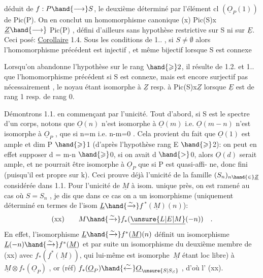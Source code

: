 
déduit de $f:P\hand{\longrightarrow} S$, le deuxième  déterminé par l'élément  cl $(\underline{O}_P(1))$ de
Pic(P). On en conclut un homomorphisme canonique
(x) \qquad Pic(S)x $\underline{Z} \hand{\longrightarrow}$ Pic(P)  ,
défini d'ailleurs sans hypothèse restrictive sur S ni sur $\underline{E}$.  Ceci posé:
\uline{Corollaire} 1.4.\placedmargin{\ensuremath{\swarrow}}   Sous les conditions de 1.. , si $S\neq\emptyset$ 
 alors l'homomorphisme précédent est  injectif , et même
bijectif lorsque S est connexe

\placedmargin{[} Lorsqu'on  abandonne l'hypothèse
sur le rang $\hand{\geqslant} 2$,  il résulte de 1.2. et 1.. que l'homomorphisme précédent
si S est connexe, mais
est encore surjectif  pas nécessairement , le noyau étant
isomorphe 
à $\underline{Z}$  resp. à  Pic(S)x$\underline{Z}$  lorsque  $\underline{E}$  est de rang 1\hand{,} resp. de rang 0.

Démontrons  1.1.  en commençant par l'unicité.  Tout d'abord, si S est
le spectre d'un corps, notons que  $\underline{O}(n)$ n'est isomorphe à $\underline{O}(m)$ i.e.
$\underline{O}(m-n)$  n'est  isomorphe à $\underline{O}_P$ , que si  n=m i.e.  n-m=0 .  Cela provient
du fait que $\underline{O}(1)$ est ample et  dim P $\hand{\geqslant}$1 (d'après l'hypothèse rang E $\hand{\geqslant}$2):
on peut en effet supposer  d = m-n $\hand{\geqslant}$0, si on avait d $\hand{>}$0, alors $\underline{O}(d)$
serait ample, et ne pourrait être isomorphe à  $\underline{O}_P$ que si P est quasi-affi-%
ne, donc fini (puisqu'il est propre sur k).  Ceci prouve déjà  l'unicité
de la famille $(S_n)_{n\hand{\in}\underline{Z}}$  considérée dans 1.1.  Pour l'unicité de $\underline{M}$ à isom.
unique près, on est ramené au cas où  $S=S_n$ , je dis que dans ce cas on a
un isomorphisme  (uniquement déterminé en termes de l'isom  $\underline{L} \hand{\xrightarrow{\sim}} f$$^*$$(\underline{M})(n)$):
\[ \text{(xx)} \qquad M \hand{\xrightarrow{\sim}} f_*(\underline{\unsure{L|E|M}}(-n)) \quad . \]
En effet,  l'isomorphisme  $\underline{L} \hand{\xrightarrow{\sim}} f^*(\underline{M})(n)$   définit un isomorphisme
$\underline{L}(-n) \hand{\xrightarrow{\sim}} f^*(\underline{M})$  et par suite un isomorphisme du deuxième membre de (xx)
avec $f_*(f^*(\underline{M}))$, qui lui-même est isomorphe \,$\underline{M}$ étant loc libre) à
$\underline{M}\otimes f_*(\underline{O}_P)$ , or  (réf)  $f_*(\underline{O}_P) \hand{\xleftarrow{\sim}} \underline{O}_{\unsure{S|S_S}}$ ,  d'où l' (xx).\placedmargin{\ensuremath{\backslash}}

